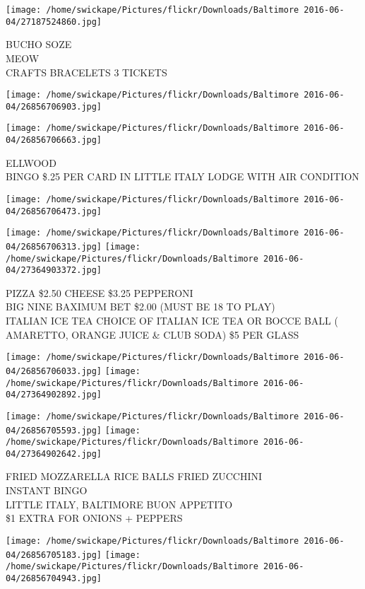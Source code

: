 \documentclass[10pt,letterpaper]{article}
\begin{document}
\texttt{[image: /home/swickape/Pictures/flickr/Downloads/Baltimore 2016-06-04/27187524860.jpg]}

BUCHO SOZE\\
MEOW\\
CRAFTS BRACELETS 3 TICKETS
\pagebreak

\texttt{[image: /home/swickape/Pictures/flickr/Downloads/Baltimore 2016-06-04/26856706903.jpg]}

\vspace{0.25in}
\texttt{[image: /home/swickape/Pictures/flickr/Downloads/Baltimore 2016-06-04/26856706663.jpg]}

ELLWOOD\\
BINGO \$.25 PER CARD IN LITTLE ITALY LODGE WITH AIR CONDITION
\pagebreak

\texttt{[image: /home/swickape/Pictures/flickr/Downloads/Baltimore 2016-06-04/26856706473.jpg]}

\vspace{0.25in}
\texttt{[image: /home/swickape/Pictures/flickr/Downloads/Baltimore 2016-06-04/26856706313.jpg]}
\texttt{[image: /home/swickape/Pictures/flickr/Downloads/Baltimore 2016-06-04/27364903372.jpg]}

PIZZA \$2.50 CHEESE \$3.25 PEPPERONI\\
BIG NINE BAXIMUM BET \$2.00 (MUST BE 18 TO PLAY)\\
ITALIAN ICE TEA CHOICE OF ITALIAN ICE TEA OR BOCCE BALL ( AMARETTO, ORANGE JUICE \& CLUB SODA) \$5 PER GLASS
\pagebreak

\texttt{[image: /home/swickape/Pictures/flickr/Downloads/Baltimore 2016-06-04/26856706033.jpg]}
\texttt{[image: /home/swickape/Pictures/flickr/Downloads/Baltimore 2016-06-04/27364902892.jpg]}

\texttt{[image: /home/swickape/Pictures/flickr/Downloads/Baltimore 2016-06-04/26856705593.jpg]}
\texttt{[image: /home/swickape/Pictures/flickr/Downloads/Baltimore 2016-06-04/27364902642.jpg]}

FRIED MOZZARELLA RICE BALLS FRIED ZUCCHINI\\
INSTANT BINGO\\
LITTLE ITALY, BALTIMORE BUON APPETITO\\
\$1 EXTRA FOR ONIONS + PEPPERS
\pagebreak

\texttt{[image: /home/swickape/Pictures/flickr/Downloads/Baltimore 2016-06-04/26856705183.jpg]}
\texttt{[image: /home/swickape/Pictures/flickr/Downloads/Baltimore 2016-06-04/26856704943.jpg]}
\end{document}
